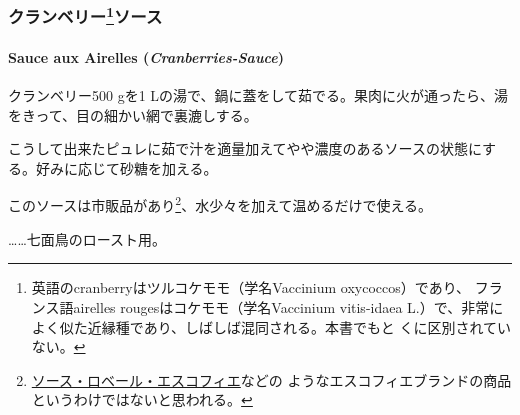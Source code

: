 \begin{recette}
\hypertarget{ux30afux30e9ux30f3ux30d9ux30eaux30fc1ux30bdux30fcux30b9}{%
\subsubsection[クランベリーソース]{\texorpdfstring{クランベリー\footnote{英語のcranberryはツルコケモモ（学名Vaccinium
  oxycoccos）であり、 フランス語airelles rougesはコケモモ（学名Vaccinium
  vitis-idaea
  L.）で、非常によく似た近縁種であり、しばしば混同される。本書でもと
  くに区別されていない。}ソース}{クランベリーソース}}\label{ux30afux30e9ux30f3ux30d9ux30eaux30fc1ux30bdux30fcux30b9}}

\hypertarget{cranberries-sauce}{%
\paragraph{\texorpdfstring{Sauce aux Airelles
(\emph{Cranberries-Sauce})}{Sauce aux Airelles (Cranberries-Sauce)}}\label{cranberries-sauce}}



クランベリー500 gを1
Lの湯で、鍋に蓋をして茹でる。果肉に火が通ったら、湯をきって、目の細かい網で裏漉しする。

こうして出来たピュレに茹で汁を適量加えてやや濃度のあるソースの状態にする。好みに応じて砂糖を加える。

このソースは市販品があり\footnote{\protect\hyperlink{sauce-robert-escoffier}{ソース・ロベール・エスコフィエ}などの
  ようなエスコフィエブランドの商品というわけではないと思われる。}、水少々を加えて温めるだけで使える。

\ldots{}\ldots{}七面鳥のロースト用。


\end{recette}
